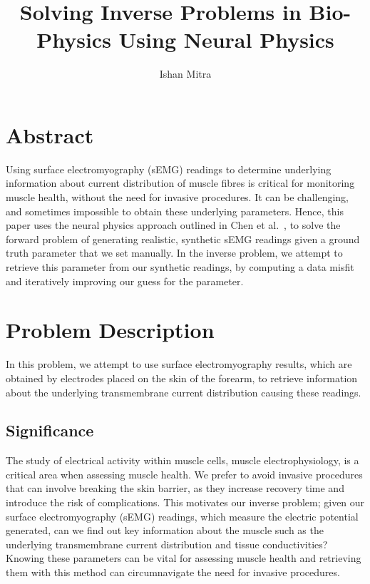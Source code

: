 \documentclass[project-plan]{report-template}
\title{Solving Inverse Problems in Bio-Physics Using Neural Physics}
\author{Ishan Mitra}
\begin{document}
\maketitlepage  %

\section{Abstract}

 Using surface electromyography (sEMG) readings to determine underlying information about current distribution of muscle fibres is critical for monitoring muscle health, without the need for invasive procedures. It can be challenging, and sometimes impossible to obtain these underlying parameters. Hence, this paper uses the neural physics approach outlined in Chen et al.~\cite{chen2026}, to solve the forward problem of generating realistic, synthetic sEMG readings given a ground truth parameter that we set manually. In the inverse problem, we attempt to retrieve this parameter from our synthetic readings, by computing a data misfit and iteratively improving our guess for the parameter.
 

\section{Problem Description}

In this problem, we attempt to use surface electromyography results, which are obtained by electrodes placed on the skin of the forearm, to retrieve information about the underlying transmembrane current distribution causing these readings.

\subsection{Significance}
The study of electrical activity within muscle cells, muscle electrophysiology, is a critical area when assessing muscle health. We prefer to avoid invasive procedures that can involve breaking the skin barrier, as they increase recovery time and introduce the risk of complications. This motivates our inverse problem; given our surface electromyography (sEMG) readings, which measure the electric potential generated, can we find out key information about the muscle such as the underlying transmembrane current distribution and tissue conductivities? Knowing these parameters can be vital for assessing muscle health and retrieving them with this method can circumnavigate the need for invasive procedures. 
\end{document}
